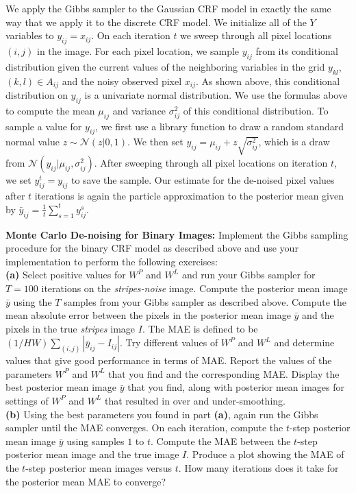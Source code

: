 \documentclass[11pt]{article}
\newcommand{\discrete}{stripes}
\begin{document}
We apply the Gibbs sampler to the Gaussian CRF model in exactly the same way that we apply it to the discrete CRF model. We initialize all of the $Y$ variables to $y_{ij}=x_{ij}$. On each iteration $t$ we sweep through all pixel locations $(i,j)$ in the image. For each pixel location, we sample $y_{ij}$ from its conditional distribution given the current values of the neighboring variables in the grid $y_{kl}$, $(k,l)\in A_{ij}$ and the noisy observed pixel $x_{ij}$. As shown above, this conditional distribution on $y_{ij}$ is a univariate normal distribution. We use the formulas above to compute the mean $\mu_{ij}$ and variance $\sigma^2_{ij}$ of this conditional distribution. To sample a value for $y_{ij}$, we first use a library function to draw a random standard normal value $z\sim \mathcal{N}(z|0,1)$. We then set $y_{ij} = \mu_{ij} + z\sqrt{\sigma^2_{ij}}$, which is a draw from $\mathcal{N}(y_{ij}|\mu_{ij},\sigma^2_{ij})$. After sweeping through all pixel locations on iteration $t$,  we set $y^t_{ij}=y_{
ij}$ to save the sample. Our estimate for the de-noised pixel values after $t$ iterations is again the particle approximation to the posterior mean given by $\bar{y}_{ij} = \frac{1}{t}\sum_{s=1}^ty^s_{ij}$.



\begin{problem}{40} \textbf{Monte Carlo De-noising for Binary Images:}
Implement the Gibbs sampling procedure for the binary CRF model as described above and use your implementation to perform the following exercises:
\\

\textbf{(a)} Select positive values for $W^P$ and $W^L$ and run your Gibbs sampler for $T=100$ iterations on the \textit{\discrete-noise} image. Compute the posterior mean image $\bar{y}$ using the $T$ samples from your Gibbs sampler as described above. Compute the mean absolute error between the pixels in the posterior mean image $\bar{y}$ and the pixels in the true \textit{\discrete} image $I$. The MAE is defined to be $(1/HW)\sum_{(i,j)}|\bar{y}_{ij} - I_{ij}|$. Try different values of $W^P$ and $W^L$ and determine values that give good performance in terms of MAE. Report the values of the parameters $W^P$ and $W^L$ that you find and the corresponding MAE. Display the best posterior mean image $\bar{y}$ that you find, along with posterior mean images for settings of $W^P$ and $W^L$ that resulted in over and under-smoothing.\\

\textbf{(b)} Using the best parameters you found in part \textbf{(a)}, again run the Gibbs sampler until the MAE converges. On each iteration, compute the $t$-step posterior mean image $\bar{y}$ using samples $1$ to $t$. Compute the MAE between the $t$-step posterior mean image and the true image $I$. Produce a plot showing the MAE of the $t$-step posterior mean images versus $t$. How many iterations does it take for the posterior mean MAE to converge?
\end{problem}
\end{document}

